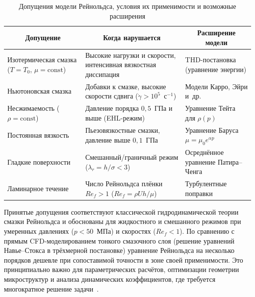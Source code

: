 \begin{table}[!ht]
\centering
\caption{Допущения модели Рейнольдса, условия их применимости
  и возможные расширения}
\label{tab:model_limits}
\begin{tabularx}{\textwidth}{|X|X|X|}
\hline
\multicolumn{1}{|c|}{\textbf{Допущение}}
  & \multicolumn{1}{c|}{\textbf{Когда нарушается}}
  & \multicolumn{1}{c|}{\textbf{Расширение модели}} \\
\hline
Изотермическая смазка ($T = T_0$, $\mu = \mathrm{const}$)
  & Высокие нагрузки и скорости, интенсивная вязкостная
    диссипация
  & THD-постановка (уравнение энергии) \\
\hline
Ньютоновская смазка
  & Добавки к смазке, высокие скорости сдвига
    ($\dot\gamma > 10^5$~с$^{-1}$)
  & Модели Карро, Эйри и~др. \\
\hline
Несжимаемость ($\rho = \mathrm{const}$)
  & Давление порядка $0{,}5$~ГПа и выше (EHL-режим)
  & Уравнение Тейта для $\rho(p)$ \\
\hline
Постоянная вязкость
  & Пьезовязкостные смазки, давление выше $0{,}1$~ГПа
  & Уравнение Баруса $\mu = \mu_0 e^{\alpha p}$ \\
\hline
Гладкие поверхности
  & Смешанный/граничный режим ($\lambda_r = h/\sigma < 3$)
  & Осреднённое уравнение Патира--Ченга \\
\hline
Ламинарное течение
  & Число Рейнольдса плёнки $Re_f > 1$
    ($Re_f = \rho U h / \mu$)
  & Турбулентные поправки \\
\hline
\end{tabularx}
\end{table}

\FloatBarrier

Принятые допущения соответствуют классической
гидродинамической теории смазки Рейнольдса и обоснованы для
жидкостного и смешанного режимов при умеренных давлениях
($p < 50$~МПа) и скоростях ($Re_f < 1$). По сравнению
с прямым CFD-моделированием тонкого смазочного слоя (решение
уравнений Навье--Стокса в трёхмерной постановке) уравнение
Рейнольдса на несколько порядков дешевле при сопоставимой
точности в зоне своей применимости. Это принципиально важно
для параметрических расчётов, оптимизации геометрии
микроструктур и анализа динамических коэффициентов, где
требуется многократное решение задачи~\cite{hori2002,suddapalli2015}.
